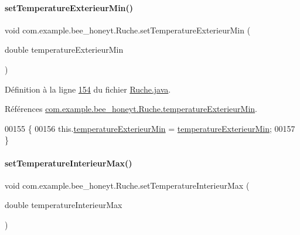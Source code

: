 \paragraph{\texorpdfstring{set\+Temperature\+Exterieur\+Min()}{setTemperatureExterieurMin()}}
{\footnotesize\ttfamily void com.\+example.\+bee\+\_\+honeyt.\+Ruche.\+set\+Temperature\+Exterieur\+Min (\begin{DoxyParamCaption}\item[{double}]{temperature\+Exterieur\+Min }\end{DoxyParamCaption})}



Définition à la ligne \hyperlink{_ruche_8java_source_l00154}{154} du fichier \hyperlink{_ruche_8java_source}{Ruche.\+java}.



Références \hyperlink{_ruche_8java_source_l00027}{com.\+example.\+bee\+\_\+honeyt.\+Ruche.\+temperature\+Exterieur\+Min}.


\begin{DoxyCode}
00155     \{
00156         this.\hyperlink{classcom_1_1example_1_1bee__honeyt_1_1_ruche_a6e88eae7cc58b7c7ca3846d789fe1c2b}{temperatureExterieurMin} = 
      \hyperlink{classcom_1_1example_1_1bee__honeyt_1_1_ruche_a6e88eae7cc58b7c7ca3846d789fe1c2b}{temperatureExterieurMin};
00157     \}
\end{DoxyCode}
\mbox{\label{classcom_1_1example_1_1bee__honeyt_1_1_ruche_ad0c1bb53162040918c8a9f2ed7c37dd0}} 
\paragraph{\texorpdfstring{set\+Temperature\+Interieur\+Max()}{setTemperatureInterieurMax()}}
{\footnotesize\ttfamily void com.\+example.\+bee\+\_\+honeyt.\+Ruche.\+set\+Temperature\+Interieur\+Max (\begin{DoxyParamCaption}\item[{double}]{temperature\+Interieur\+Max }\end{DoxyParamCaption})}



